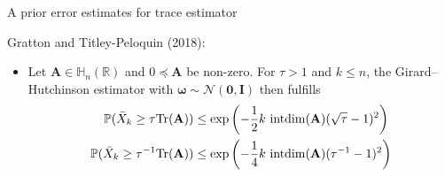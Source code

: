 \documentclass{beamer}
\newcommand{\bgk}[1]{\boldsymbol{#1}}
\newcommand{\bzero}{\bgk{0}}
\newcommand{\bomega}{\bgk{\omega}}
\newcommand{\bvec}[1]{\mathbf{#1}}
\newcommand{\vA}{\bvec{A}}
\newcommand{\vI}{\bvec{I}}
\newcommand{\bitem}{\item[$\bullet$]}
\begin{document}
\begin{frame}{A prior error estimates for trace estimator}

Gratton and Titley-Peloquin (2018):
\begin{itemize}
    \bitem Let $\vA \in \mathbb{H}_n(\mathbb{R})$ and $0 \preccurlyeq \vA$ be non-zero. For $\tau > 1$ and $k\leq n$, the Girard--Hutchinson estimator with $\bomega \sim \mathcal{N}(\bzero, \vI)$ then fulfills
    \begin{align*}
    \mathbb{P}(\bar{X}_k \geq \tau {\rm Tr}(\vA))
    &\leq \exp\left(-\frac{1}{2} k ~{\rm intdim}(\vA) (\sqrt{\tau} -1 )^2\right)\\
    \mathbb{P}(\bar{X}_k \geq \tau^{-1} {\rm Tr}(\vA))
    &\leq \exp\left(-\frac{1}{4} k ~{\rm intdim}(\vA) (\tau^{-1} -1 )^2\right)
    \end{align*}
\end{itemize}
    
\end{frame}
\end{document}
